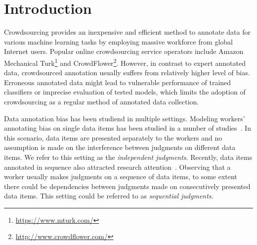 \section{Introduction}
\label{sec:intro}

Crowdsourcing provides an inexpensive and efficient method to annotate data for various machine learning tasks 
by employing massive workforce from global Internet users.  
Popular online crowdsourcing service operators include 
Amazon Mechanical Turk\footnote{\url{https://www.mturk.com/}} and CrowdFlower\footnote{\url{http://www.crowdflower.com/}}.  
However, in contrast to expert annotated data, 
crowdsourced annotation usually suffers from relatively higher level of bias.  
Erroneous annotated data might lead to vulnerable performance of trained classifiers 
or imprecise evaluation of tested models, 
which limits the adoption of crowdsourcing as a regular method of annotated data collection.  

Data annotation bias has been studiend in multiple settings.  
Modeling workers' annotating bias on single data items has been studied in a number of studies~\cite{raykar:nips2011ranking,raykar:icml2009,raykar:jmlr2010,whitehill:nips2009}.  
In this scenario, data items are presented separately to the workers 
and no assumption is made on the interference between judgments on different data items.  
We refer to this setting as the \emph{independent judgments}.  
Recently, data items annotated in sequence also attracted research attention~\cite{mozer:nips2010,scholer:sigir2013,scholer:sigir2011}.  
Observing that a worker usually makes judgments on a sequence of data items, 
to some extent there could be dependencies between judgments made on consecutively presented data items.  
This setting could be referred to as \emph{sequential judgments}.  

